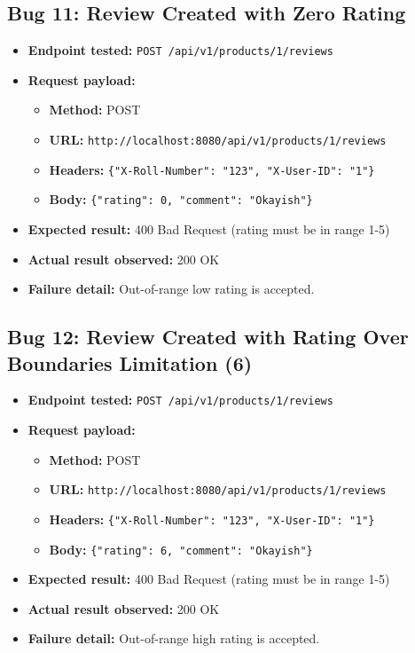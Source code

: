 ﻿\documentclass[11pt,a4paper]{article}
\begin{document}
\subsection*{Bug 11: Review Created with Zero Rating}
\begin{itemize}
  \item \textbf{Endpoint tested:} \texttt{POST /api/v1/products/1/reviews}
  \item \textbf{Request payload:}
  \begin{itemize}
    \item \textbf{Method:} POST
    \item \textbf{URL:} \texttt{http://localhost:8080/api/v1/products/1/reviews}
    \item \textbf{Headers:} \texttt{\{"X-Roll-Number": "123", "X-User-ID": "1"\}}
    \item \textbf{Body:} \texttt{\{"rating": 0, "comment": "Okayish"\}}
  \end{itemize}
  \item \textbf{Expected result:} 400 Bad Request (rating must be in range 1-5)
  \item \textbf{Actual result observed:} 200 OK
  \item \textbf{Failure detail:} Out-of-range low rating is accepted.
\end{itemize}

\subsection*{Bug 12: Review Created with Rating Over Boundaries Limitation (6)}
\begin{itemize}
  \item \textbf{Endpoint tested:} \texttt{POST /api/v1/products/1/reviews}
  \item \textbf{Request payload:}
  \begin{itemize}
    \item \textbf{Method:} POST
    \item \textbf{URL:} \texttt{http://localhost:8080/api/v1/products/1/reviews}
    \item \textbf{Headers:} \texttt{\{"X-Roll-Number": "123", "X-User-ID": "1"\}}
    \item \textbf{Body:} \texttt{\{"rating": 6, "comment": "Okayish"\}}
  \end{itemize}
  \item \textbf{Expected result:} 400 Bad Request (rating must be in range 1-5)
  \item \textbf{Actual result observed:} 200 OK
  \item \textbf{Failure detail:} Out-of-range high rating is accepted.
\end{itemize}
\end{document}
